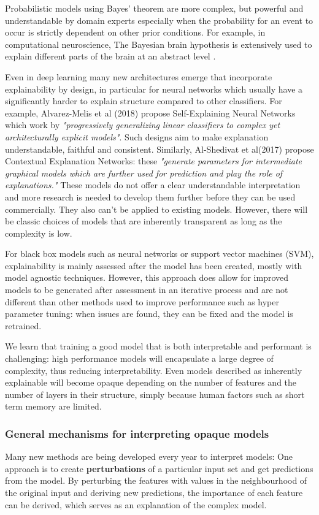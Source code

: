 \documentclass[proposal]{softeng}
\begin{document}
Probabilistic models using Bayes' theorem are more complex, but powerful and understandable by domain experts especially when the probability for an event to occur is strictly dependent on other prior conditions. For example, in computational neuroscience, The Bayesian brain hypothesis is extensively used to explain different parts of the brain at an abstract level \cite{YairWeiss2002Miao}.

Even in deep learning many new architectures emerge that incorporate explainability by design, in particular for neural networks which usually have a significantly harder to explain structure compared to other classifiers. For example, Alvarez-Melis et al (2018)\cite{alvarezmelis2018robust} propose Self-Explaining Neural Networks which work by \textit{"progressively generalizing linear classifiers to complex yet architecturally explicit models"}. Such designs aim to make explanation understandable, faithful and consistent. Similarly, Al-Shedivat et al(2017)\cite{alshedivat2017contextual} propose Contextual Explanation Networks: these \textit{"generate parameters for intermediate graphical models which are further used for prediction and play the role of explanations."} These models do not offer a clear understandable interpretation and more research is needed to develop them further before they can be used commercially. They also can't be applied to existing models. However, there will be classic choices of models that are inherently transparent as long as the complexity is low. 

For black box models such as neural networks or support vector machines (SVM), explainability is mainly assessed after the model has been created, mostly with model agnostic techniques. However, this approach does allow for improved models to be generated after assessment in an iterative process and are not different than other methods used to improve performance such as hyper parameter tuning: when issues are found, they can be fixed and the model is retrained.

We learn that training a good model that is both interpretable and performant is challenging: high performance models will encapsulate a large degree of complexity, thus reducing interpretability. Even models described as inherently explainable will become opaque depending on the number of features and the number of layers in their structure, simply because human factors such as short term memory are limited.

\subsubsection{General mechanisms for interpreting opaque models}
Many new methods are being developed every year to interpret models: 
One approach is to create \textbf{perturbations} of a particular input set and get predictions from the model. By perturbing the features with values in the neighbourhood of the original input and deriving new predictions, the importance of each feature can be derived, which serves as an explanation of the complex model.
\end{document}
